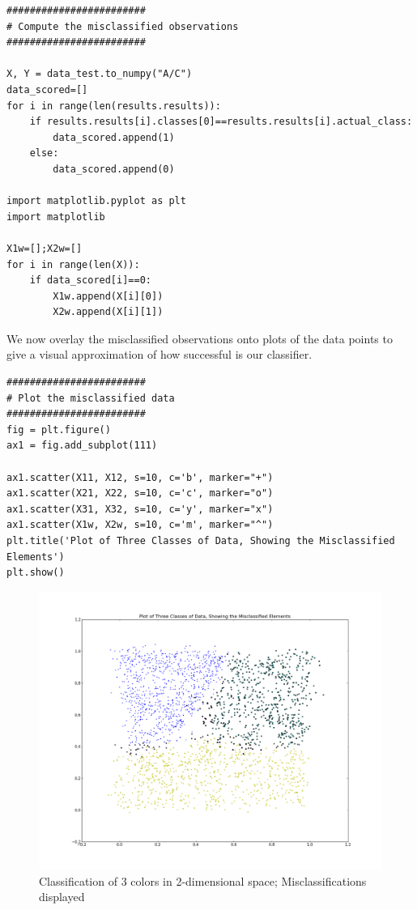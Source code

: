 \begin{lstlisting}[caption={Compute the Misclassified Observations},label=2nd,firstnumber=115]
########################
# Compute the misclassified observations
########################

X, Y = data_test.to_numpy("A/C")
data_scored=[]
for i in range(len(results.results)):
    if results.results[i].classes[0]==results.results[i].actual_class:
        data_scored.append(1)
    else:
        data_scored.append(0)

import matplotlib.pyplot as plt
import matplotlib

X1w=[];X2w=[]
for i in range(len(X)):
    if data_scored[i]==0:
        X1w.append(X[i][0])
        X2w.append(X[i][1])
\end{lstlisting}

\begin{flushleft}We now overlay the misclassified observations onto plots of the data points to give a visual approximation of how successful is our classifier.
\end{flushleft}

\begin{lstlisting}[caption={Compute the Misclassified Observations},label=2nd,firstnumber=123]
########################
# Plot the misclassified data
########################
fig = plt.figure()
ax1 = fig.add_subplot(111)

ax1.scatter(X11, X12, s=10, c='b', marker="+")
ax1.scatter(X21, X22, s=10, c='c', marker="o")
ax1.scatter(X31, X32, s=10, c='y', marker="x")
ax1.scatter(X1w, X2w, s=10, c='m', marker="^")
plt.title('Plot of Three Classes of Data, Showing the Misclassified Elements')
plt.show()
\end{lstlisting}

\begin{figure}[H]
    \centering
       \includegraphics[width=6.5 in]{3_groups_mis.png}
    \caption{Classification of 3 colors in 2-dimensional space; Misclassifications displayed}
    \label{Example Data}
\end{figure}

